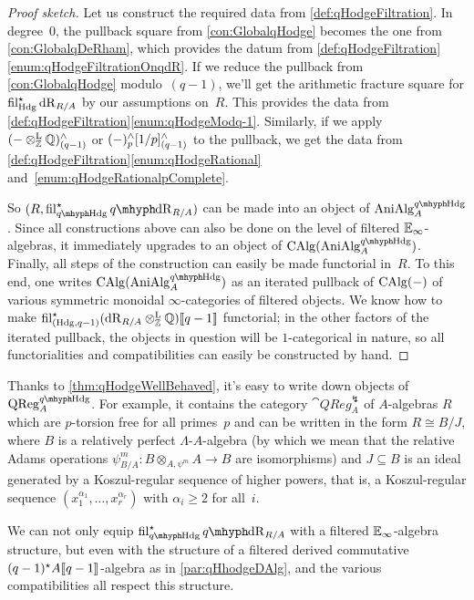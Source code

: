 \documentclass[DIV=12,numbers=enddot,leqno,bibliography=totoc]{scrartcl}
\begin{document}
	\begin{proof}[Proof sketch]
		Let us construct the required data from \cref{def:qHodgeFiltration}. In degree~$0$, the pullback square from \cref{con:GlobalqHodge} becomes the one from \cref{con:GlobalqDeRham}, which provides the datum from \cref{def:qHodgeFiltration}\cref{enum:qHodgeFiltrationOnqdR}. If we reduce the pullback from \cref{con:GlobalqHodge} modulo~$(q-1)$, we'll get the arithmetic fracture square for $\operatorname{fil}_{\mathrm{Hdg}}^\star\mathrm{dR}_{R/A}$ by our assumptions on~$R$. This provides the data from \cref{def:qHodgeFiltration}\cref{enum:qHodgeModq-1}. Similarly, if we apply $(-\otimes^{\mathrm{L}}_{\mathbb{Z}}\mathbb{Q})_{(q-1)}^\wedge$ or $(-)_p^\wedge[1/p]_{(q-1)}^\wedge$ to the pullback, we get the data from \cref{def:qHodgeFiltration}\cref{enum:qHodgeRational} and~\cref{enum:qHodgeRationalpComplete}.
		
		So $(R,\fil_{\qHodge}^\star\qdeRham_{R/A})$ can be made into an object of $\cat{AniAlg}_A^{\qHodge}$. Since all constructions above can also be done on the level of filtered $\mathbb{E}_\infty$-algebras, it immediately upgrades to an object of $\CAlg(\cat{AniAlg}_A^{\qHodge})$. Finally, all steps of the construction can easily be made functorial in~$R$. To this end, one writes $\CAlg(\cat{AniAlg}_A^{\qHodge})$ as an iterated pullback of $\operatorname{CAlg}(-)$ of various symmetric monoidal $\infty$-categories of filtered objects. We know how to make $\operatorname{fil}_{(\mathrm{Hdg},q-1)}^\star(\mathrm{dR}_{R/A}\otimes^{\mathrm{L}}_{\mathbb{Z}}\mathbb{Q})\llbracket q-1\rrbracket$ functorial; in the other factors of the iterated pullback, the objects in question will be $1$-categorical in nature, so all functorialities and compatibilities can easily be constructed by hand.
	\end{proof}
	\begin{rem}
		Thanks to \cref{thm:qHodgeWellBehaved}, it's easy to write down objects of $\cat{QReg}_A^{\qHodge}$. For example, it contains the category $\cat{QReg}_A^{\lightning\!}$ of $A$-algebras $R$ which are $p$-torsion free for all primes~$p$ and can be written in the form $R\cong B/J$, where $B$ is a relatively perfect $\Lambda$-$A$-algebra (by which we mean that the relative Adams operations $\psi_{B/A}^m\colon B\otimes_{A,\psi^m }A\rightarrow B$ are isomorphisms) and $J\subseteq B$ is an ideal generated by a Koszul-regular sequence of higher powers, that is, a Koszul-regular sequence $(x_1^{\alpha_1},\dotsc,x_r^{\alpha_r})$ with $\alpha_i\geqslant 2$ for all~$i$.
	\end{rem}
	\begin{rem}\label{rem:qHodgeQuasiregularDAlg}
		We can not only equip $\fil_{\qHodge}^\star\qdeRham_{R/A}$ with a filtered $\mathbb{E}_\infty$-algebra structure, but even with the structure of a filtered derived commutative $(q-1)^\star A\llbracket q-1\rrbracket$-algebra as in \cref{par:qHhodgeDAlg}, and the various compatibilities all respect this structure.
	\end{rem}
\end{document}
